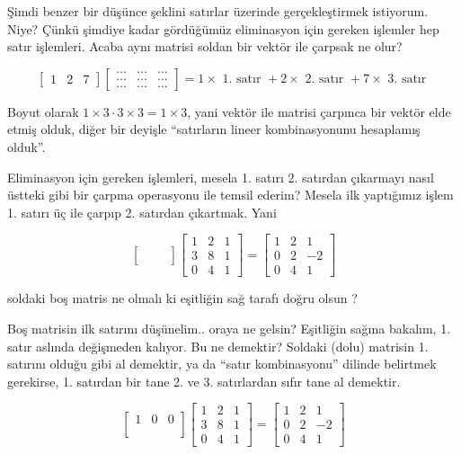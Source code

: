 \documentclass[12pt,fleqn]{article}\usepackage{../../common}
\begin{document}
Şimdi benzer bir düşünce şeklini satırlar üzerinde gerçekleştirmek
istiyorum. Niye? Çünkü şimdiye kadar gördüğümüz eliminasyon için gereken
işlemler hep satır işlemleri. Acaba aynı matrisi soldan bir vektör ile
çarpsak ne olur? 

$$ 
\left[\begin{array}{rrr}
1 & 2 & 7
\end{array}\right]
\left[\begin{array}{rrr}
    \dots & \dots & \dots \\
    \dots &  \dots & \dots \\
    \dots & \dots &  \dots
  \end{array}\right]
 = 
1 \times \textrm{ 1. satır } + 2  \times \textrm{ 2. satır } + 
7  \times \textrm{ 3. satır } 
$$

Boyut olarak $1 \times 3 \cdot 3 \times 3 = 1 \times 3$, yani vektör ile
matrisi çarpınca bir vektör elde etmiş olduk, diğer bir deyişle
``satırların lineer kombinasyonunu hesaplamış olduk''.

Eliminasyon için gereken işlemleri, mesela 1. satırı 2. satırdan çıkarmayı
nasıl üstteki gibi bir çarpma operasyonu ile temsil ederim? Mesela ilk
yaptığımız işlem 1. satırı üç ile çarpıp 2. satırdan çıkartmak. Yani

$$ 
\left[\begin{array}{rrr}
 &  &  \\
 &  &  \\
 &  & 
\end{array}\right]
\left[\begin{array}{rrr}
1 & 2 & 1 \\
3 & 8 & 1 \\
0 & 4 & 1
\end{array}\right] =
\left[\begin{array}{rrr}
    1 & 2 & 1 \\
    0 & 2 & -2 \\
    0 & 4 & 1
  \end{array}\right]
 $$

soldaki boş matris ne olmalı ki eşitliğin sağ tarafı doğru olsun ?

Boş matrisin ilk satırını düşünelim.. oraya ne gelsin? Eşitliğin sağına
bakalım, 1. satır aslında değişmeden kalıyor. Bu ne demektir? Soldaki
(dolu) matrisin 1. satırını olduğu gibi al demektir, ya da ``satır
kombinasyonu'' dilinde belirtmek gerekirse, 1. satırdan bir tane 2. ve
3. satırlardan sıfır tane al demektir. 

$$ 
\left[\begin{array}{rrr}
1 & 0 & 0 \\
 &  &  \\
 &  & 
\end{array}\right]
\left[\begin{array}{rrr}
1 & 2 & 1 \\
3 & 8 & 1 \\
0 & 4 & 1
\end{array}\right] =
\left[\begin{array}{rrr}
    1 & 2 & 1 \\
    0 & 2 & -2 \\
    0 & 4 & 1
  \end{array}\right]
 $$
\end{document}
